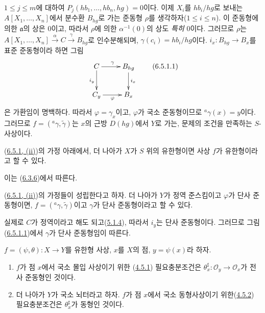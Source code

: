 \begin{enumerate}
    $1\leq j\leq m$에 대하여
    $P_j(hb_1,\ldots,hb_n,hg)=0$이다. 이제 $X_i$를 $hb_i/hg$로 보내는
    $A[X_1,\ldots,X_n]$에서 분수환 $B_{hg}$로 가는 준동형 $\rho$를
    생각하자($1\leq i\leq n$). 이 준동형에 의한 $\mathfrak a$의 상은
    0이고, 따라서 $\rho$에 의한 $\alpha^{-1}(0)$의 상도
    \emph{특히} 0이다. 그러므로 $\rho$는
    $A[X_1,\ldots,X_n]\xrightarrow{\alpha}C
    \xrightarrow{\gamma}B_{hg}$로 인수분해되며,
    $\gamma(c_i)=hb_i/hg$이다. $i_x:B_{hg}\to B_x$를 표준
    준동형이라 하면 그림
    \[
      \xymatrix{
        C\ar[r]^\gamma\ar[d]_{i_y} & B_{hg}\ar[d]^{i_x}\\
        C_y\ar[r]_\varphi & B_x
      }
      \tag{6.5.1.1}\label{I.6.5.1.1-ko}
    \]
    은 가환임이 명백하다. 따라서 $\varphi=\gamma_x$이고, $\varphi$가 국소
    준동형이므로 ${}^a\gamma(x)=y$이다. 그러므로
    $f=({}^a\gamma,\widetilde{\gamma})$는 $x$의 근방 $D(hg)$에서 $Y$로
    가는, 문제의 조건을 만족하는 $S$-사상이다.
\end{enumerate}

\begin{corollary}[6.5.2]
\label{I.6.5.2-ko}
(\hyperref[I.6.5.1-ko]{6.5.1, (ii)})의 가정 아래에서, 더 나아가 $X$가
$S$ 위의 유한형이면 사상 $f$가 유한형이라고 할 수 있다.
\end{corollary}

이는 (\hyperref[I.6.3.6-ko]{6.3.6})에서 따른다.

\begin{corollary}[6.5.3]
\label{I.6.5.3-ko}
(\hyperref[I.6.5.1-ko]{6.5.1, (ii)})의 가정들이 성립한다고 하자. 더 나아가
$Y$가 정역 준스킴이고 $\varphi$가 단사 준동형이면,
$f=({}^a\gamma,\widetilde{\gamma})$이고 $\gamma$가 단사 준동형이라고 할 수
있다.
\end{corollary}

실제로 $C$가 정역이라고 해도 되고(\hyperref[I.5.1.4-ko]{5.1.4}), 따라서
$i_y$는 단사 준동형이다. 그러므로 그림
(\hyperref[I.6.5.1.1-ko]{6.5.1.1})에서 $\gamma$가 단사 준동형임이 따른다.

\begin{proposition}[6.5.4]
\label{I.6.5.4-ko}
$f=(\psi,\theta):X\to Y$를 유한형 사상, $x$를 $X$의 점,
$y=\psi(x)$라 하자.
\begin{enumerate}
  \item[\rm(i)] $f$가 점 $x$에서 국소 몰입 사상이기 위한
    (\hyperref[I.4.5.1-ko]{4.5.1}) 필요충분조건은
    $\theta_x^\sharp:\mathscr{O}_y\to\mathscr{O}_x$가 전사 준동형인 것이다.
  \item[\rm(ii)] 더 나아가 $Y$가 국소 뇌터라고 하자. $f$가 점 $x$에서
    국소 동형사상이기 위한(\hyperref[I.4.5.2-ko]{4.5.2}) 필요충분조건은
    $\theta_x^\sharp$가 동형인 것이다.
\end{enumerate}
\end{proposition}

